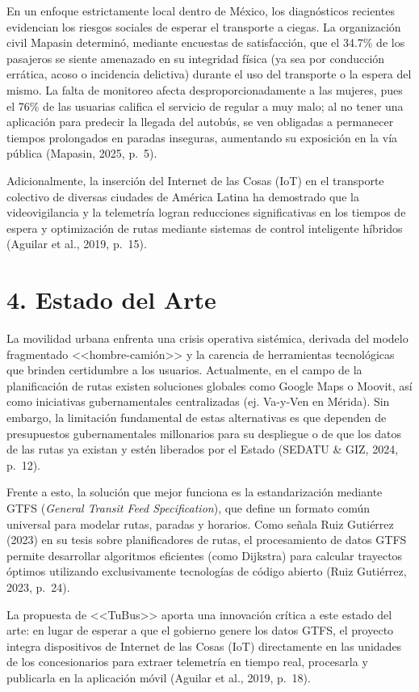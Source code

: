 \documentclass[12pt,letterpaper]{article}
\newcommand{\seccion}[1]{%
  \section*{#1}\addcontentsline{toc}{section}{#1}}
\begin{document}
En un enfoque estrictamente local dentro de México, los diagnósticos recientes
evidencian los riesgos sociales de esperar el transporte a ciegas. La
organización civil Mapasin determinó, mediante encuestas de satisfacción, que
el 34.7\% de los pasajeros se siente amenazado en su integridad física (ya sea
por conducción errática, acoso o incidencia delictiva) durante el uso del
transporte o la espera del mismo. La falta de monitoreo afecta
desproporcionadamente a las mujeres, pues el 76\% de las usuarias califica el
servicio de regular a muy malo; al no tener una aplicación para predecir la
llegada del autobús, se ven obligadas a permanecer tiempos prolongados en
paradas inseguras, aumentando su exposición en la vía pública (Mapasin, 2025,
p.~5).

Adicionalmente, la inserción del Internet de las Cosas (IoT) en el transporte
colectivo de diversas ciudades de América Latina ha demostrado que la
videovigilancia y la telemetría logran reducciones significativas en los
tiempos de espera y optimización de rutas mediante sistemas de control
inteligente híbridos (Aguilar et al., 2019, p.~15).

\seccion{4. Estado del Arte}

La movilidad urbana enfrenta una crisis operativa sistémica, derivada del
modelo fragmentado <<hombre-camión>> y la carencia de herramientas tecnológicas
que brinden certidumbre a los usuarios. Actualmente, en el campo de la
planificación de rutas existen soluciones globales como Google Maps o Moovit,
así como iniciativas gubernamentales centralizadas (ej. Va-y-Ven en Mérida).
Sin embargo, la limitación fundamental de estas alternativas es que dependen de
presupuestos gubernamentales millonarios para su despliegue o de que los datos
de las rutas ya existan y estén liberados por el Estado (SEDATU \& GIZ, 2024,
p.~12).

Frente a esto, la solución que mejor funciona es la estandarización mediante
GTFS (\textit{General Transit Feed Specification}), que define un formato común
universal para modelar rutas, paradas y horarios. Como señala Ruiz Gutiérrez
(2023) en su tesis sobre planificadores de rutas, el procesamiento de datos
GTFS permite desarrollar algoritmos eficientes (como Dijkstra) para calcular
trayectos óptimos utilizando exclusivamente tecnologías de código abierto (Ruiz
Gutiérrez, 2023, p.~24).

La propuesta de <<TuBus>> aporta una innovación crítica a este estado del arte:
en lugar de esperar a que el gobierno genere los datos GTFS, el proyecto
integra dispositivos de Internet de las Cosas (IoT) directamente en las
unidades de los concesionarios para extraer telemetría en tiempo real,
procesarla y publicarla en la aplicación móvil (Aguilar et al., 2019, p.~18).
\end{document}
